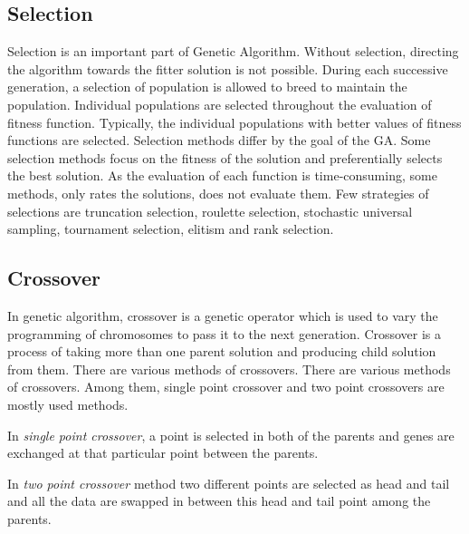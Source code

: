 \subsection{Selection}{\label{section:Selection} 
Selection is an important part of Genetic Algorithm. Without selection, directing the algorithm towards the fitter solution is not possible. During each successive generation, a selection of population is allowed to breed to maintain the population. Individual populations are selected throughout the evaluation of fitness function. Typically, the individual populations with better values of fitness functions are selected. Selection methods differ by the goal of the GA. Some selection methods focus on the fitness of the solution and preferentially selects the best solution. As the evaluation of each function is time-consuming, some methods, only rates the solutions, does not evaluate them. Few strategies of selections are truncation selection, roulette selection, stochastic universal sampling, tournament selection, elitism and rank selection. 
\subsection{Crossover}{\label{section:Crossover}
In genetic algorithm, crossover is a genetic operator which is used to vary the programming of chromosomes to pass it to the next generation. Crossover is a process of taking more than one parent solution and producing child solution from them. There are various methods of crossovers.  There are various methods of crossovers. Among them, single point crossover and two point crossovers are mostly used methods. \par 
In \textit{single point crossover}, a point is selected in both of the parents and genes are exchanged at that particular point between the parents.\par 
In \textit{two point crossover} method two different points are selected as head and tail and all the data are swapped in between this head and tail point among the parents. 

}}
